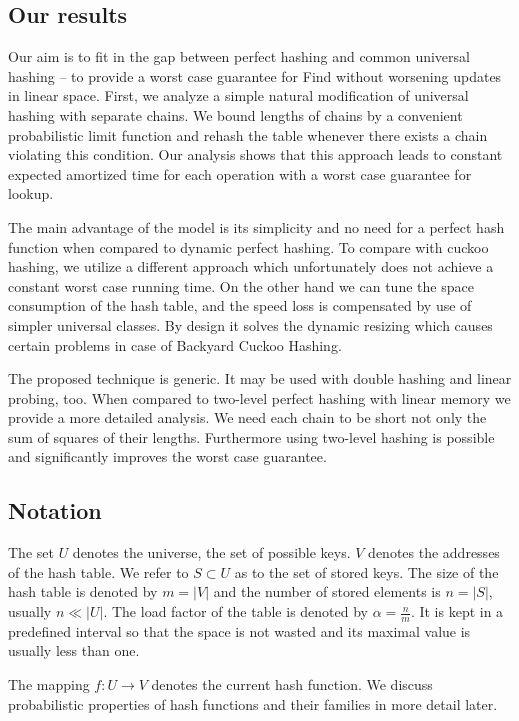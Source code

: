 \subsection{Our results}
Our aim is to fit in the gap between perfect hashing and common universal hashing -- to provide a worst case guarantee for Find without worsening updates in linear space.
First, we analyze a simple natural modification of universal hashing with separate chains.
We bound lengths of chains by a convenient probabilistic limit function and rehash the table whenever there exists a chain violating this condition.
Our analysis shows that this approach leads to constant expected amortized time for each operation with a worst case guarantee for lookup.

The main advantage of the model is its simplicity and no need for a perfect hash function when compared to dynamic perfect hashing.
To compare with cuckoo hashing, we utilize a different approach which unfortunately does not achieve a constant worst case running time.
On the other hand we can tune the space consumption of the hash table, and the speed loss is compensated by use of simpler universal classes.
By design it solves the dynamic resizing which causes certain problems in case of Backyard Cuckoo Hashing.

The proposed technique is generic. It may be used with double hashing and linear probing, too. 
When compared to two-level perfect hashing with linear memory we provide a more detailed analysis. 
We need each chain to be short not only the sum of squares of their lengths.
Furthermore using two-level hashing is possible and significantly improves the worst case guarantee.

\subsection{Notation}
The set $U$ denotes the universe, the set of possible keys. $V$ denotes the addresses of the hash table. We refer to $S \subset U$ as to the set of stored keys. The size of the hash table is denoted by $m = |V|$ and the number of stored elements is $n = |S|$, usually $n \ll |U|$. The load factor of the table is denoted by $\alpha = \frac{n}{m}$. It is kept in a predefined interval so that the space is not wasted and its maximal value is usually less than one.

The mapping $f\colon U \rightarrow V$ denotes the current hash function. We discuss probabilistic properties of hash functions and their families in more detail later.

